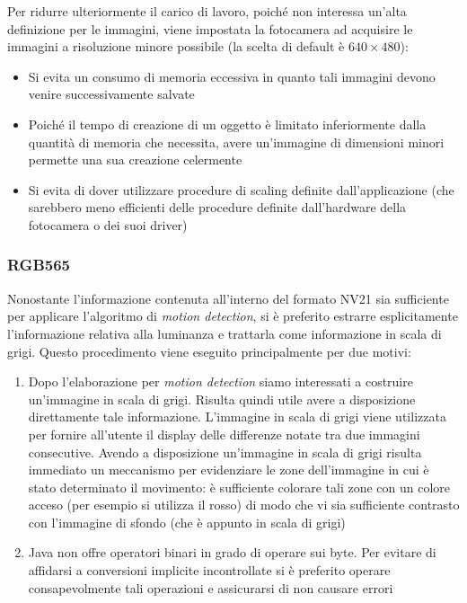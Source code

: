 Per ridurre ulteriormente il carico di lavoro, poiché non interessa un'alta definizione per le immagini, viene impostata la fotocamera ad acquisire le immagini a risoluzione minore possibile (la scelta di default è $640×480$):
\begin{itemize}
  \item Si evita un consumo di memoria eccessiva in quanto tali immagini devono venire successivamente salvate
  \item Poiché il tempo di creazione di un oggetto è limitato inferiormente dalla quantità di memoria che necessita, avere un'immagine di dimensioni minori permette una sua creazione celermente
  \item Si evita di dover utilizzare procedure di scaling definite dall'applicazione (che sarebbero meno efficienti delle procedure definite dall'hardware della fotocamera o dei suoi driver)
\end{itemize}

\subsubsection{RGB565}

Nonostante l'informazione contenuta all'interno del formato NV21 sia sufficiente per applicare l'algoritmo di \textit{motion detection}, si è preferito estrarre esplicitamente l'informazione relativa alla luminanza e trattarla come informazione in scala di grigi. Questo procedimento viene eseguito principalmente per due motivi:
\begin{enumerate}
  \item Dopo l'elaborazione per \textit{motion detection} siamo interessati a costruire un'immagine in scala di grigi. Risulta quindi utile avere a disposizione direttamente tale informazione. L'immagine in scala di grigi viene utilizzata per fornire all'utente il display delle differenze notate tra due immagini consecutive. Avendo a disposizione un'immagine in scala di grigi risulta immediato un meccanismo per evidenziare le zone dell'immagine in cui è stato determinato il movimento: è sufficiente colorare tali zone con un colore acceso (per esempio si utilizza il rosso) di modo che vi sia sufficiente contrasto con l'immagine di sfondo (che è appunto in scala di grigi)
  \item Java non offre operatori binari in grado di operare sui byte. Per evitare di affidarsi a conversioni implicite incontrollate si è preferito operare consapevolmente tali operazioni e assicurarsi di non causare errori
\end{enumerate}

